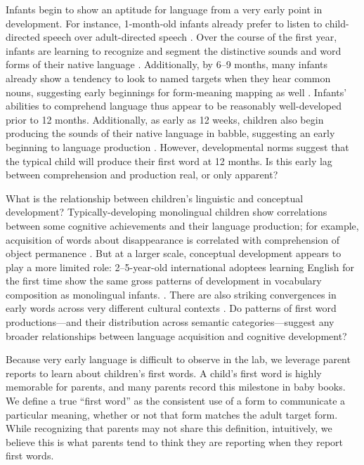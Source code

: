 \documentclass[10pt,letterpaper]{article}
\begin{document}
Infants begin to show an aptitude for language from a very early point in development. For instance, 1-month-old infants already prefer to listen to child-directed speech over adult-directed speech \cite{cooper1990}. Over the course of the first year, infants are learning to recognize and segment the distinctive sounds and word forms of their native language \cite{kuhl2004,werker2005}. Additionally, by 6--9 months, many infants already show a tendency to look to named targets when they hear common nouns, suggesting early beginnings for form-meaning mapping as well \cite{tincoff2012,bergelson2012}. Infants' abilities to comprehend language thus appear to be reasonably well-developed prior to 12 months. Additionally, as early as 12 weeks, children also begin producing the sounds of their native language in babble, suggesting an early beginning to language production \cite{kuhl2004}. However, developmental norms suggest that the typical child will produce their first word at 12 months. Is this early lag between comprehension and production real, or only apparent?

What is the relationship between children's linguistic and conceptual development? Typically-developing monolingual children show correlations between some cognitive achievements and their language production; for example, acquisition of words about disappearance is correlated with comprehension of object permanence \cite{gopnik1986}. But at a larger scale, conceptual development appears to play a more limited role: 2--5-year-old international adoptees learning English for the first time show the same gross patterns of development in vocabulary composition as monolingual infants. \cite{snedeker2007}. There are also striking convergences in early words across very different cultural contexts \cite{tardif2007}. Do patterns of first word productions---and their distribution across semantic categories---suggest any broader relationships between language acquisition and cognitive development? 

Because very early language is difficult to observe in the lab, we leverage parent reports to learn about children's first words. A child's first word is highly memorable for parents, and many parents record this milestone in baby books. We define a true ``first word'' as the consistent use of a form to communicate a particular meaning, whether or not that form matches the adult target form. While recognizing that parents may not share this definition, intuitively, we believe this is what parents tend to think they are reporting when they report first words. 
\end{document}
